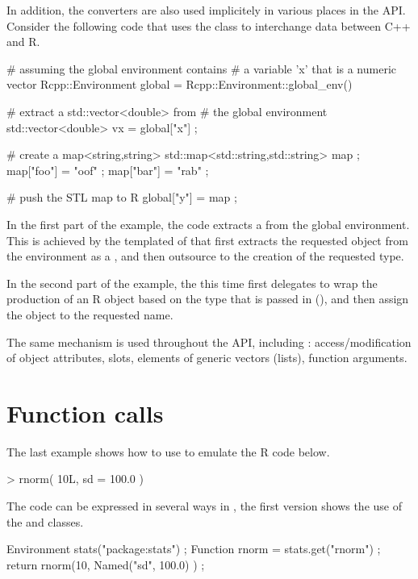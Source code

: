 In addition, the converters are also used implicitely
in various places in the  API. 
Consider the following code that uses the  class to 
interchange data between C++ and R.

\begin{example}
# assuming the global environment contains 
# a variable 'x' that is a numeric vector
Rcpp::Environment global = 
	Rcpp::Environment::global_env()

# extract a std::vector<double> from 
# the global environment
std::vector<double> vx = global["x"] ;

# create a map<string,string>
std::map<std::string,std::string> map ;
map["foo"] = "oof" ;
map["bar"] = "rab" ;

# push the STL map to R
global["y"] = map ;
\end{example}

In the first part of the example, the code extracts a 
 from the global environment. This is 
achieved by the templated  of 
that first extracts the requested object from the environment as a , 
and then outsource to  the creation of the 
requested type. 

In the second part of the example, the  this time 
first delegates to wrap the production of an R object based on the 
type that is passed in (), 
and then assign the object to the requested name.

The same mechanism is used throughout the API, including : access/modification
of object attributes, slots, elements of generic vectors (lists), 
function arguments. 

\section{Function calls}

The last example shows how to use  to emulate the R code below.

\begin{example}
> rnorm( 10L, sd = 100.0 )
\end{example}

The code can be expressed in several ways in , the first version
shows the use of the  and  classes. 

\begin{example}
Environment stats("package:stats") ;
Function rnorm = stats.get("rnorm") ;
return rnorm(10, Named("sd", 100.0) ) ;
\end{example}

